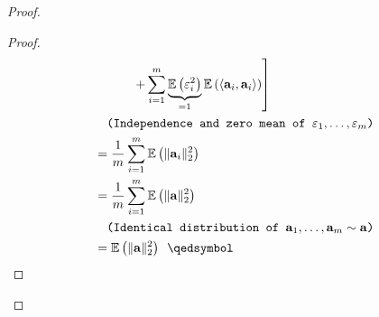 \begin{proof}
\begin{proof}
\begin{align*}
                & \qquad\quad \left. + \sum_{i = 1}^m \underbrace{\mathbb{E} \left ( \varepsilon_i^2 \right )}_{= 1} \mathbb{E} \left ( \langle \mathbf{a}_i, \mathbf{a}_i \rangle \right )\right]\\
                & \quad \comment{Independence and zero mean of $\varepsilon_1, \dots, \varepsilon_m$}\\
                & = \frac{1}{m} \sum_{i=1}^m \mathbb{E} \left ( \| \mathbf{a}_i \|_2^2 \right ) \\
                & = \frac{1}{m} \sum_{i=1}^m \mathbb{E} \left ( \| \mathbf{a} \|_2^2 \right ) \\
                & \quad \comment{Identical distribution of $\mathbf{a}_1, \dots, \mathbf{a}_m \sim \mathbf{a}$}\\
                & = \mathbb{E} \left ( \| \mathbf{a} \|_2^2 \right ) \enspace \qedsymbol\\
            \end{align*}
            \endgroup
        \end{proof}
\end{proof}

